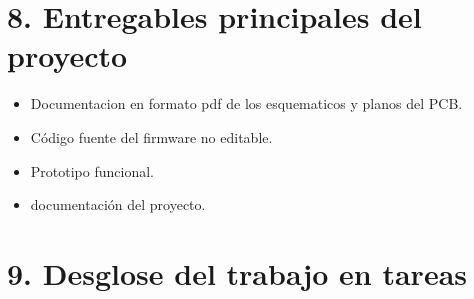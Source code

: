 \documentclass[
11pt, %
codirector, %
]{charter}
\begin{document}
\section{8. Entregables principales del proyecto}
\label{sec:entregables}

\begin{itemize}
	\item Documentacion en formato pdf de los esquematicos y planos del PCB.
	\item Código fuente del firmware no editable.
	\item Prototipo funcional.
	\item documentación del proyecto.
\end{itemize}

\section{9. Desglose del trabajo en tareas}
\label{sec:wbs}
\end{document}
